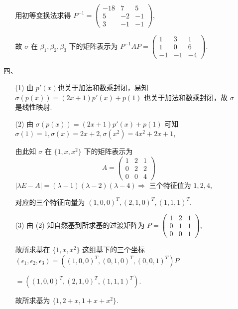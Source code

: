 \documentclass{ctexbook}
\begin{document}
\begin{enumerate}
\begin{enumerate}
\[        \]
        用初等变换法求得 \(P^{-1}=\begin{pmatrix}
            -18 & 7 & 5\\
            5 & -2 & -1\\
            3 & -1 & -1
        \end{pmatrix}\),\par
        故 \(\sigma\) 在 \(\beta_1,\beta_2,\beta_3\) 下的矩阵表示为 \(P^{-1}AP=\begin{pmatrix}
            1 & 3 & 1\\
            1 & 0 & 6\\
            -1 & -1 & -4
        \end{pmatrix}\).
    \end{enumerate}
    \item[四、]
    \begin{enumerate}
        \item[(1)] 由 \(p'(x)\)也关于加法和数乘封闭，易知 \(\sigma(p(x))=(2x+1)p'(x)+p(1)\) 也关于加法和数乘封闭，故 \(\sigma\) 是线性映射.
        \item[(2)] 由 \(\sigma(p(x))=(2x+1)p'(x)+p(1)\) 可知 \(\sigma(1)=1,\sigma(x)=2x+2,\sigma(x^2)=4x^2+2x+1\),\par
        由此知 \(\sigma\) 在 \(\{1,x,x^2\}\) 下的矩阵表示为
        \[
        A=\begin{pmatrix}
            1 & 2 & 1\\
            0 & 2 & 2\\
            0 & 0 & 4
        \end{pmatrix}
        \]
        \(|\lambda E-A|=(\lambda-1)(\lambda-2)(\lambda-4) \Rightarrow\) 三个特征值为 \(1,2,4\),\par
        对应的三个特征向量为 \((1,0,0)^{T},(2,1,0)^{T},(1,1,1)^{T}\).
        \item[(3)] 由 (2) 知自然基到所求基的过渡矩阵为
        \(P=\begin{pmatrix}
            1 & 2 & 1\\
            0 & 1 & 1\\
            0 & 0 & 1
        \end{pmatrix}\),\par
        故所求基在 \(\{1,x,x^2\}\) 这组基下的三个坐标 \(\left(\epsilon_1,\epsilon_2,\epsilon_3\right)=\left((1,0,0)^{T},(0,1,0)^{T},(0,0,1)^{T}\right)P\)\par
        \(=\left((1,0,0)^{T},(2,1,0)^{T},(1,1,1)^{T}\right)\).\par
        故所求基为 \(\{1,2+x,1+x+x^2\}\).

\end{enumerate}
\end{enumerate}
\end{document}
